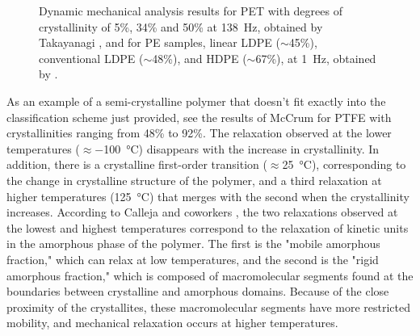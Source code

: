 \begin{figure}[htbp]
\begin{subfigure}[b]{0.45\textwidth}
                        \caption{}
                        \label{subfig:pe_dma}
        \end{subfigure}
    \caption{Dynamic mechanical analysis results for  PET with degrees of crystallinity of 5\%, 34\% and 50\% at \SI{138}{\hertz}, obtained by Takayanagi \citep{wardIntroductionMechanicalProperties2004}, and for  PE samples, linear LDPE ($\sim$45\%), conventional LDPE ($\sim$48\%), and HDPE ($\sim$67\%), at \SI{1}{\hertz}, obtained by \cite{khannaDynamicMechanicalRelaxations1985}.}
\label{fig:dma_cryst}
\end{figure}

As an example of a semi-crystalline polymer that doesn't fit exactly into the classification scheme just provided, see the results of McCrum \citep{mccrumStudyInternalFriction1959} for PTFE with crystallinities ranging from 48\% to 92\%.
The relaxation observed at the lower temperatures ($\approx$\SI{-100}{\celsius}) disappears with the increase in crystallinity.
In addition, there is a crystalline first-order transition ($\approx$\SI{25}{\celsius}), corresponding to the change in crystalline structure of the polymer, and a third relaxation at higher temperatures (\SI{125}{\celsius}) that merges with the second when the crystallinity increases.
According to Calleja and coworkers \citep{callejaWhereGlassTransition2013}, the two relaxations observed at the lowest and highest temperatures correspond to the relaxation of kinetic units in the amorphous phase of the polymer.
The first is the "mobile amorphous fraction," which can relax at low temperatures, and the second is the "rigid amorphous fraction," which is composed of macromolecular segments found at the boundaries between crystalline and amorphous domains.
Because of the close proximity of the crystallites, these macromolecular segments have more restricted mobility, and mechanical relaxation occurs at higher temperatures.

\enlargethispage{\baselineskip}



